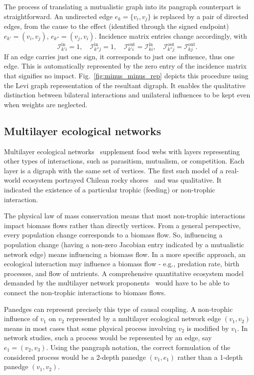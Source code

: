 \documentclass[a4paper,12pt]{article}
\theoremstyle{definition}
\theoremstyle{remark}
\newcommand{\tin}{\mathrm{in}}
\newcommand{\out}{\mathrm{out}}
\newcommand{\inci}{\mathcal{I}^{\tin}}
\newcommand{\inco}{\mathcal{I}^{\out}}
\begin{document}
The process of translating a mutualistic graph into its pangraph counterpart is straightforward. An undirected edge $e_k=\{v_i, v_j\}$ is replaced by a pair of directed edges, from the cause to the effect (identified through the signed endpoint) $e_{k'}=(v_i, v_j)$, $e_{k''}=(v_j, v_i)$. Incidence matrix entries change accordingly, with $$\inci_{k'i}=1, \quad \inci_{k''j}=1, \quad \inco_{k'i}=\inci_{ki}, \quad \inco_{k''j}=\inco_{kj}.$$ If an edge carries just one sign, it corresponds to just one influence, thus one edge. This is automatically represented by the zero entry of the incidence matrix that signifies no impact. Fig.~\ref{fig:minus_minus_rep} depicts this procedure using the Levi graph representation of the resultant digraph. It enables the qualitative distinction between bilateral interactions and unilateral influences to be kept even when weights are neglected.


\subsection{Multilayer ecological networks}

Multilayer ecological networks~\cite{Pilosof_2015, Hutchinson2019} supplement food webs with layers representing other types of interactions, such as parasitism, mutualism, or competition. Each layer is a digraph with the same set of vertices. The first such model of a real-world ecosystem portrayed Chilean rocky shores~\cite{Kefi_multilayer_Chilean} and was qualitative. It indicated the existence of a particular trophic (feeding) or non-trophic interaction. 

The physical law of mass conservation means that most non-trophic interactions impact biomass flows rather than directly vertices. From a general perspective, every population change corresponds to a biomass flow. So, influencing a population change (having a non-zero Jacobian entry indicated by a mutualistic network edge) means influencing a biomass flow. In a more specific approach, an ecological interaction may influence a biomass flow - e.g., predation rate, birth processes, and flow of nutrients. A comprehensive quantitative ecosystem model demanded by the multilayer network proponents~\cite{Kefi_multilayer_Chilean} would have to be able to connect the non-trophic interactions to biomass flows.

Panedges can represent precisely this type of causal coupling. A non-trophic influence of $v_1$ on $v_2$ represented by a multilayer ecological network edge $(v_1,v_2)$ means in most cases that some physical process involving $v_2$ is modified by $v_1$. In network studies, such a process would be represented by an edge, say $e_1=(v_2,v_3)$. Using the pangraph notation, the correct formulation of the considered process would be a 2-depth panedge $(v_1, e_1)$ rather than a 1-depth panedge $(v_1,v_2)$.
\end{document}
